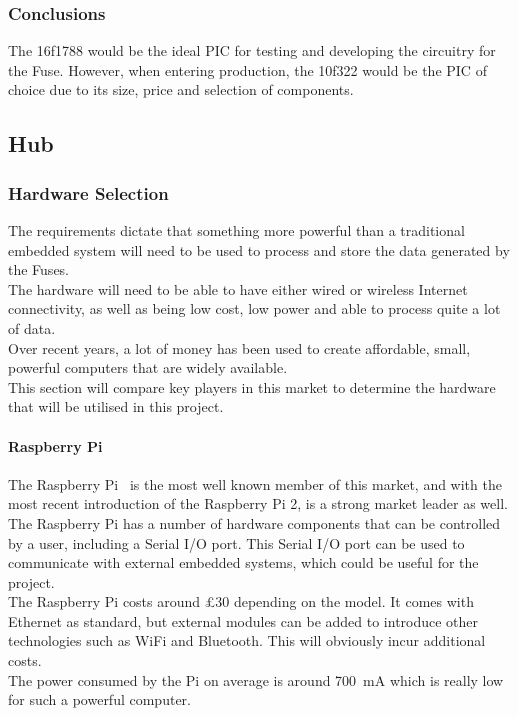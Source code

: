 \documentclass[preprint,12pt,3p]{elsarticle}
\begin{document}
\subsubsection{Conclusions}
The 16f1788 would be the ideal PIC for testing and developing the circuitry for the Fuse. However, when entering production, the 10f322 would be the PIC of choice due to its size, price and selection of components.



\subsection{Hub}
\subsubsection{Hardware Selection}
The requirements dictate that something more powerful than a traditional embedded system will need to be used to process and store the data generated by the Fuses.\\
The hardware will need to be able to have either wired or wireless Internet connectivity, as well as being low cost, low power and able to process quite a lot of data.\\
Over recent years, a lot of money has been used to create affordable, small, powerful computers that are widely available.\\
This section will compare key players in this market to determine the hardware that will be utilised in this project.
\paragraph{Raspberry Pi}
The Raspberry Pi~\cite{raspberrypi} is the most well known member of this market, and with the most recent introduction of the Raspberry Pi 2, is a strong market leader as well.\\
The Raspberry Pi has a number of hardware components that can be controlled by a user, including a Serial I/O port. This Serial I/O port can be used to communicate with external embedded systems, which could be useful for the project.\\
The Raspberry Pi costs around \pounds30 depending on the model. It comes with Ethernet as standard, but external modules can be added to introduce other technologies such as WiFi and Bluetooth. This will obviously incur additional costs.\\
The power consumed by the Pi on average is around \SI{700}{\milli\ampere} which is really low for such a powerful computer.
\end{document}
